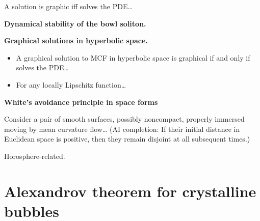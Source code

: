 \begin{definition}
\label{definition-graphical}

\end{definition}

\begin{lemma}
\label{lemma-graphical}
A solution is graphic iff solves
the PDE…
\end{lemma}

\medskip\noindent
{\bf Dynamical stability of the bowl
soliton.}

\begin{theorem}
\label{theorem-css07}

\end{theorem}

\medskip\noindent
{\bf Graphical solutions in hyperbolic
space.}

\begin{definition}
\label{definition-graphical-hyperbolic}

\end{definition}

\begin{theorem}[Unterberger, 2003]
\label{theorem-unter}
\begin{itemize}
\item A graphical solution to MCF in
hyperbolic space is graphical if and only if
solves the PDE…
\item For any locally Lipschitz function…
\end{itemize}
\end{theorem}


\medskip\noindent
{\bf White's avoidance principle in space
forms}

\begin{theorem}[White 2024]
\label{theorem-white24}
Consider a pair of smooth surfaces, possibly
noncompact, properly immersed moving by mean
curvature flow…
(AI completion:
If their initial distance in Euclidean
space is positive, then they remain disjoint at all
subsequent times.)
\end{theorem}

\begin{theorem}[Ramos et al.]
\label{theorem-ramos}
Horosphere-related.
\end{theorem}

\section{Alexandrov theorem for
crystalline bubbles}
\label{section-alexandrov-crystalline}

